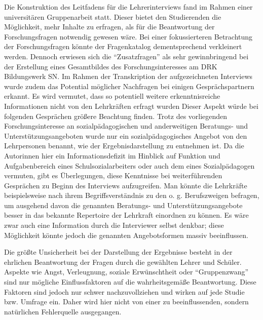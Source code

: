 Die Konstruktion des Leitfadens für die Lehrerinterviews fand im Rahmen einer universitären Gruppenarbeit statt. Dieser bietet den Studierenden die Möglichkeit, mehr Inhalte zu erfragen, als für die Beantwortung der Forschungsfragen notwendig gewesen wäre. Bei einer fokussierteren Betrachtung der Forschungsfragen könnte der Fragenkatalog dementsprechend verkleinert werden. Dennoch erwiesen sich die "`Zusatzfragen"' als sehr gewinnbringend bei der Erstellung eines Gesamtbildes des Forschungsinteresses am DRK Bildungswerk SN. Im Rahmen der Transkription der aufgezeichneten Interviews wurde zudem das Potential möglicher Nachfragen bei einigen Gesprächspartnern erkannt. Es wird vermutet, dass so potentiell weitere erkenntnisreiche Informationen nicht von den Lehrkräften erfragt wurden Dieser Aspekt würde bei folgenden Gesprächen größere Beachtung finden. Trotz des vorliegenden Forschungsinteresse an sozialpädagogischen und anderweitigen Beratungs- und Unterstützungsangeboten wurde nur ein sozialpädagogisches Angebot von den Lehrpersonen benannt, wie der Ergebnisdarstellung zu entnehmen ist. Da die Autorinnen hier ein Informationsdefizit im Hinblick auf Funktion und Aufgabenbereich eines Schulsozialarbeiters oder auch dem eines Sozialpädagogen vermuten, gibt es Überlegungen, diese Kenntnisse bei weiterführenden Gesprächen zu Beginn des Interviews aufzugreifen. Man könnte die Lehrkräfte beispielsweise nach ihrem Begriffsverständnis zu den o. g. Berufszweigen befragen, um ausgehend davon die genannten Beratungs- und Unterstützungsangebote besser in das bekannte Repertoire der Lehrkraft einordnen zu können. Es wäre zwar auch eine Information durch die Interviewer selbst denkbar; diese Möglichkeit könnte jedoch die genannten Angebotsformen massiv beeinflussen.

Die größte Unsicherheit bei der Darstellung der Ergebnisse besteht in der ehrlichen Beantwortung der Fragen durch die gewählten Lehrer und Schüler. Aspekte wie Angst, Verleugnung, soziale Erwünschtheit oder "`Gruppenzwang"' sind nur mögliche Einflussfaktoren auf die wahrheitsgemäße Beantwortung. Diese Faktoren sind jedoch nur schwer nachzuvollziehen und wirken auf jede Studie bzw. Umfrage ein. Daher wird hier nicht von einer zu beeinflussenden, sondern natürlichen Fehlerquelle ausgegangen.